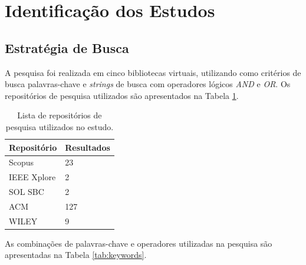 \section{Identificação dos Estudos} \label{sec:identificacao-estudos}
\subsection{Estratégia de Busca} \label{subsec:estrategias-buscas}
A pesquisa foi realizada em cinco bibliotecas virtuais, utilizando como critérios de busca palavras-chave e \textit{strings} de busca com operadores lógicos \textit{AND} e \textit{OR}. Os repositórios de pesquisa utilizados são apresentados na Tabela \ref{tab:repositorios}.

\begin{table}[h!]
\centering
\small
\begin{tabular}{|m{3cm}|m{5cm}|}
\hline 
\textbf{Repositório} & \textbf{Resultados} \\ 
\hline 
Scopus & 23 \\ 
\hline 
IEEE Xplore & 2 \\ 
\hline 
SOL SBC & 2 \\ 
\hline 
ACM & 127 \\
\hline
WILEY & 9 \\ 
\hline
\end{tabular}
\caption{Lista de repositórios de pesquisa utilizados no estudo.}
\label{tab:repositorios}
\end{table}

As combinações de palavras-chave e operadores utilizadas na pesquisa são apresentadas na Tabela \ref{tab:keywords}.

